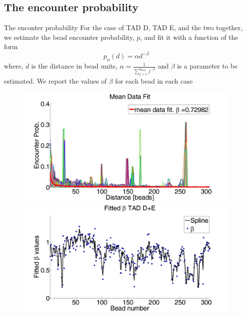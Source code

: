 \documentclass[8pt]{beamer}
\begin{document}
\subsection{The encounter probability}\label{subsection_theEncounterProbability}
\begin{frame}{The enconter probability}
For the case of TAD D, TAD E, and the two together, we estimate the bead encounter probability, $p$, and fit it with a function of the form 
\begin{equation*}
p_n(d)=\alpha d^{-\beta}
\end{equation*}
where, $d$ is the distance in bead units, $\alpha=\frac{1}{\sum_{j=1}^{d_{max}}j^{-\beta}}$ and $\beta$ is a parameter to be estimated.
We report the values of $\beta$ for each bead in each case
\begin{figure}[H]
\includegraphics[scale=0.1]{meanDataFitTADDAndE}
\includegraphics[scale=0.1]{fittedExpValuesWithSplineAverageTADDAndE}
\end{figure}
\end{frame}
\end{document}
